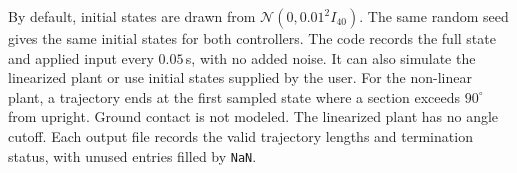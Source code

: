\documentclass[10pt]{article}
\begin{document}
By default, initial states are drawn from
$\mathcal N(0,0.01^2I_{40})$. The same random seed gives the same initial
states for both controllers. The code records the full state and applied
input every $0.05$\,s, with no added noise. It can also simulate the
linearized plant or use initial states supplied by the user.
For the non-linear plant, a trajectory ends at the first sampled state
where a section exceeds $90^\circ$ from upright.
Ground contact is not modeled. The linearized plant has no angle cutoff.
Each output file records the valid trajectory lengths and termination
status, with unused entries filled by \texttt{NaN}.
\end{document}
